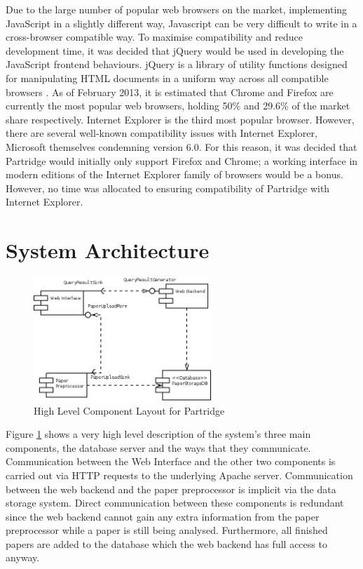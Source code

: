 Due to the large number of popular web browsers on the market, implementing
JavaScript in a slightly different way, Javascript can be very difficult to
write in a cross-browser compatible way. To maximise compatibility and reduce
development time, it was decided that jQuery would be used in developing the
JavaScript frontend behaviours. jQuery is a library of utility functions
designed for manipulating HTML documents in a uniform way across all compatible
browsers \cite{jquery2013}. As of February 2013, it is estimated that Chrome and
Firefox are currently the most popular web browsers, holding 50\% and 29.6\% of
the market share respectively\cite{browserstats2013}. Internet Explorer is the
third most popular browser. However, there are several well-known compatibility
issues with Internet Explorer, Microsoft themselves condemning version 6.0\cite{ie6death}. For this reason, it was decided that Partridge
would initially only support Firefox and Chrome; a working interface in modern editions
of the Internet Explorer family of browsers would be a bonus.  However, no time
was allocated to ensuring compatibility of Partridge with Internet Explorer.

\section{ System Architecture }


\begin{figure}[!ht]
\center
\includegraphics[width=0.6\textwidth]{images/design/components_high_level.png}
\caption{High Level Component Layout for Partridge}
\label{fig:high_level_components}
\end{figure}

Figure \ref{fig:high_level_components} shows a very high level description of
the system's three main components, the database server and the ways that they
communicate. Communication between the Web Interface and the other two
components is carried out via HTTP requests to the underlying Apache server.
Communication between the web backend and the paper preprocessor is implicit
via the data storage system. Direct communication between these components is
redundant since the web backend cannot gain any extra information from the
paper preprocessor while a paper is still being analysed. Furthermore, all finished
papers are added to the database which the web backend has full access to
anyway.


